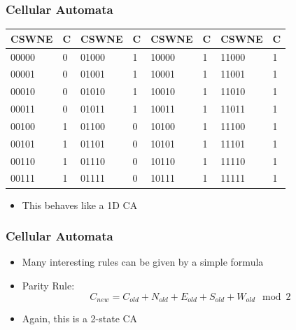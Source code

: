 \documentclass{beamer}
\begin{document}
\begin{frame}
    \frametitle{Cellular Automata}
    \begin{table}[H]
        \begin{tabular}{l|l|l|l|l|l|l|l}
        CSWNE & C & CSWNE & C & CSWNE & C & CSWNE & C \\
        \hline
        00000 & 0 & 01000 & 1 & 10000 & 1 & 11000 & 1 \\
        00001 & 0 & 01001 & 1 & 10001 & 1 & 11001 & 1 \\
        00010 & 0 & 01010 & 1 & 10010 & 1 & 11010 & 1 \\
        00011 & 0 & 01011 & 1 & 10011 & 1 & 11011 & 1 \\
        00100 & 1 & 01100 & 0 & 10100 & 1 & 11100 & 1 \\
        00101 & 1 & 01101 & 0 & 10101 & 1 & 11101 & 1 \\
        00110 & 1 & 01110 & 0 & 10110 & 1 & 11110 & 1 \\
        00111 & 1 & 01111 & 0 & 10111 & 1 & 11111 & 1
        \end{tabular}
    \end{table}
    \begin{itemize}
        \item This behaves like a 1D CA
    \end{itemize}
\end{frame}

\begin{frame}
    \frametitle{Cellular Automata}
    \begin{itemize}
        \item Many interesting rules can be given by a simple formula
        \item Parity Rule:
        \begin{equation*}
            C_{new} = C_{old} + N_{old} + E_{old} + S_{old} + W_{old} \mod 2
        \end{equation*}
        \item Again, this is a 2-state CA
    \end{itemize}
\end{frame}
\end{document}
